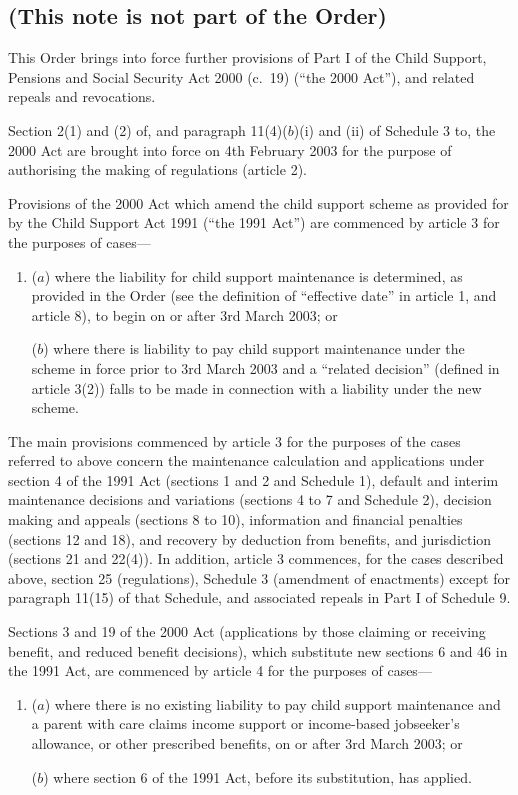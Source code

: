 \documentclass[12pt,a4paper]{article}
\begin{document}
\subsection*{(This note is not part of the Order)}

This Order brings into force further provisions of Part I of the Child Support, Pensions and Social Security Act 2000 (c.\ 19) (“the 2000 Act”), and related repeals and revocations.

Section 2(1) and (2) of, and paragraph 11(4)($b$)(i)  and (ii)  of Schedule 3 to, the 2000 Act are brought into force on 4th February 2003 for the purpose of authorising the making of regulations (article 2).

Provisions of the 2000 Act which amend the child support scheme as provided for by the Child Support Act 1991 (“the 1991 Act”) are commenced by article 3 for the purposes of cases—
\begin{enumerate}\item[]
($a$) where the liability for child support maintenance is determined, as provided in the Order (see the definition of “effective date” in article 1, and article 8), to begin on or after 3rd March 2003; or

($b$) where there is liability to pay child support maintenance under the scheme in force prior to 3rd March 2003 and a “related decision” (defined in article 3(2)) falls to be made in connection with a liability under the new scheme.
\end{enumerate}

The main provisions commenced by article 3 for the purposes of the cases referred to above concern the maintenance calculation and applications under section 4 of the 1991 Act (sections 1 and 2 and Schedule 1), default and interim maintenance decisions and variations (sections 4 to 7 and Schedule 2), decision making and appeals (sections 8 to 10), information and financial penalties (sections 12 and 18), and recovery by deduction from benefits, and jurisdiction (sections 21 and 22(4)). In addition, article 3 commences, for the cases described above, section 25 (regulations), Schedule 3 (amendment of enactments) except for paragraph 11(15) of that Schedule, and associated repeals in Part I of Schedule 9.

Sections 3 and 19 of the 2000 Act (applications by those claiming or receiving benefit, and reduced benefit decisions), which substitute new sections 6 and 46 in the 1991 Act, are commenced by article 4 for the purposes of cases—
\begin{enumerate}\item[]
($a$) where there is no existing liability to pay child support maintenance and a parent with care claims income support or income-based jobseeker’s allowance, or other prescribed benefits, on or after 3rd March 2003; or

($b$) where section 6 of the 1991 Act, before its substitution, has applied.
\end{enumerate}
\end{document}
